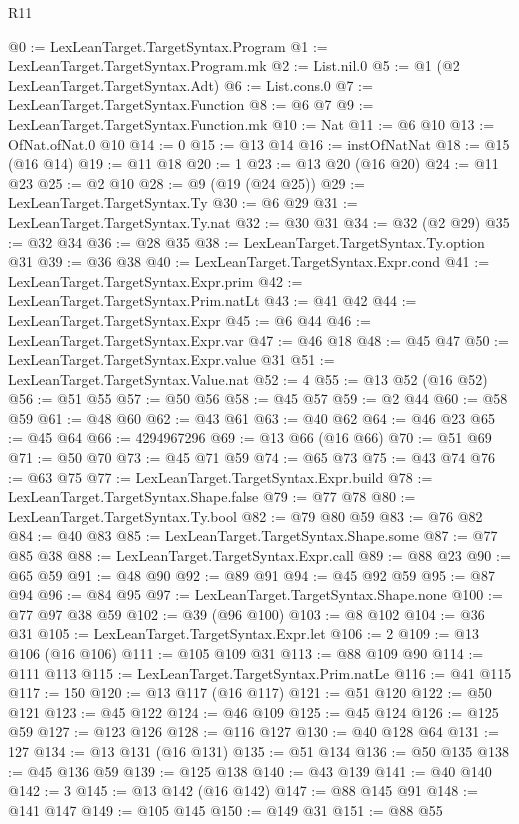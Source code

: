\begin{lexlean}{R11}
\begin{coremodule}
@0 := LexLeanTarget.TargetSyntax.Program
@1 := LexLeanTarget.TargetSyntax.Program.mk
@2 := List.nil.{0}
@5 := @1 (@2 LexLeanTarget.TargetSyntax.Adt)
@6 := List.cons.{0}
@7 := LexLeanTarget.TargetSyntax.Function
@8 := @6 @7
@9 := LexLeanTarget.TargetSyntax.Function.mk
@10 := Nat
@11 := @6 @10
@13 := OfNat.ofNat.{0} @10
@14 := 0
@15 := @13 @14
@16 := instOfNatNat
@18 := @15 (@16 @14)
@19 := @11 @18
@20 := 1
@23 := @13 @20 (@16 @20)
@24 := @11 @23
@25 := @2 @10
@28 := @9 (@19 (@24 @25))
@29 := LexLeanTarget.TargetSyntax.Ty
@30 := @6 @29
@31 := LexLeanTarget.TargetSyntax.Ty.nat
@32 := @30 @31
@34 := @32 (@2 @29)
@35 := @32 @34
@36 := @28 @35
@38 := LexLeanTarget.TargetSyntax.Ty.option @31
@39 := @36 @38
@40 := LexLeanTarget.TargetSyntax.Expr.cond
@41 := LexLeanTarget.TargetSyntax.Expr.prim
@42 := LexLeanTarget.TargetSyntax.Prim.natLt
@43 := @41 @42
@44 := LexLeanTarget.TargetSyntax.Expr
@45 := @6 @44
@46 := LexLeanTarget.TargetSyntax.Expr.var
@47 := @46 @18
@48 := @45 @47
@50 := LexLeanTarget.TargetSyntax.Expr.value @31
@51 := LexLeanTarget.TargetSyntax.Value.nat
@52 := 4
@55 := @13 @52 (@16 @52)
@56 := @51 @55
@57 := @50 @56
@58 := @45 @57
@59 := @2 @44
@60 := @58 @59
@61 := @48 @60
@62 := @43 @61
@63 := @40 @62
@64 := @46 @23
@65 := @45 @64
@66 := 4294967296
@69 := @13 @66 (@16 @66)
@70 := @51 @69
@71 := @50 @70
@73 := @45 @71 @59
@74 := @65 @73
@75 := @43 @74
@76 := @63 @75
@77 := LexLeanTarget.TargetSyntax.Expr.build
@78 := LexLeanTarget.TargetSyntax.Shape.false
@79 := @77 @78
@80 := LexLeanTarget.TargetSyntax.Ty.bool
@82 := @79 @80 @59
@83 := @76 @82
@84 := @40 @83
@85 := LexLeanTarget.TargetSyntax.Shape.some
@87 := @77 @85 @38
@88 := LexLeanTarget.TargetSyntax.Expr.call
@89 := @88 @23
@90 := @65 @59
@91 := @48 @90
@92 := @89 @91
@94 := @45 @92 @59
@95 := @87 @94
@96 := @84 @95
@97 := LexLeanTarget.TargetSyntax.Shape.none
@100 := @77 @97 @38 @59
@102 := @39 (@96 @100)
@103 := @8 @102
@104 := @36 @31
@105 := LexLeanTarget.TargetSyntax.Expr.let
@106 := 2
@109 := @13 @106 (@16 @106)
@111 := @105 @109 @31
@113 := @88 @109 @90
@114 := @111 @113
@115 := LexLeanTarget.TargetSyntax.Prim.natLe
@116 := @41 @115
@117 := 150
@120 := @13 @117 (@16 @117)
@121 := @51 @120
@122 := @50 @121
@123 := @45 @122
@124 := @46 @109
@125 := @45 @124
@126 := @125 @59
@127 := @123 @126
@128 := @116 @127
@130 := @40 @128 @64
@131 := 127
@134 := @13 @131 (@16 @131)
@135 := @51 @134
@136 := @50 @135
@138 := @45 @136 @59
@139 := @125 @138
@140 := @43 @139
@141 := @40 @140
@142 := 3
@145 := @13 @142 (@16 @142)
@147 := @88 @145 @91
@148 := @141 @147
@149 := @105 @145
@150 := @149 @31
@151 := @88 @55

\end{coremodule}
\end{lexlean}
